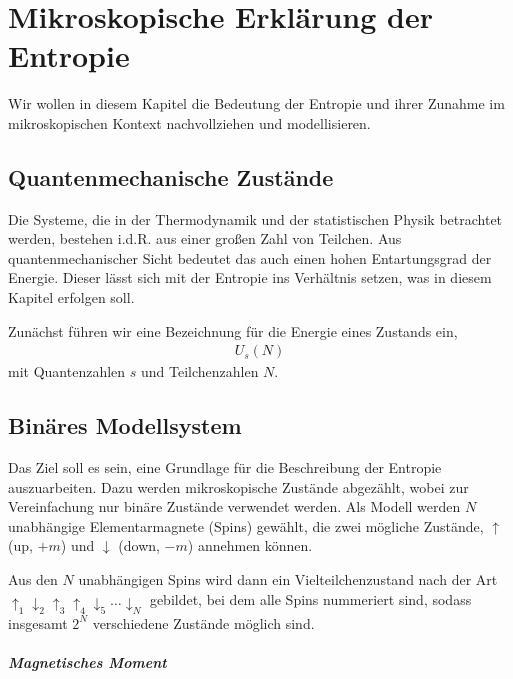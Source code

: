 
\chapter{Mikroskopische Erklärung der Entropie}
Wir wollen in diesem Kapitel die Bedeutung der Entropie und ihrer Zunahme im mikroskopischen Kontext nachvollziehen und modellisieren.
\section{Quantenmechanische Zustände}

Die Systeme, die in der Thermodynamik und der statistischen Physik betrachtet werden, bestehen i.d.R. aus einer großen Zahl von Teilchen. Aus quantenmechanischer Sicht bedeutet das auch einen hohen Entartungsgrad der Energie. Dieser lässt sich mit der Entropie ins Verhältnis setzen, was in diesem Kapitel erfolgen soll.

Zunächst führen wir eine Bezeichnung für die Energie eines Zustands ein,
\begin{align*}
    U_s(N)
\end{align*}
mit Quantenzahlen $s$ und Teilchenzahlen $N$.

\section{Binäres Modellsystem}

Das Ziel soll es sein, eine Grundlage für die Beschreibung der Entropie auszuarbeiten. Dazu werden mikroskopische Zustände abgezählt, wobei zur Vereinfachung nur binäre Zustände verwendet werden. Als Modell werden $N$ unabhängige Elementarmagnete (Spins) gewählt, die zwei mögliche Zustände, $\uparrow$ (up, $+m$) und $\downarrow$ (down, $-m$) annehmen können.

Aus den $N$ unabhängigen Spins wird dann ein Vielteilchenzustand nach der Art $\uparrow_1\downarrow_2\uparrow_3\uparrow_4\downarrow_5\dots\downarrow_N$ gebildet, bei dem alle Spins nummeriert sind, sodass insgesamt $2^N$ verschiedene Zustände möglich sind.



\paragraph*{Magnetisches Moment}

